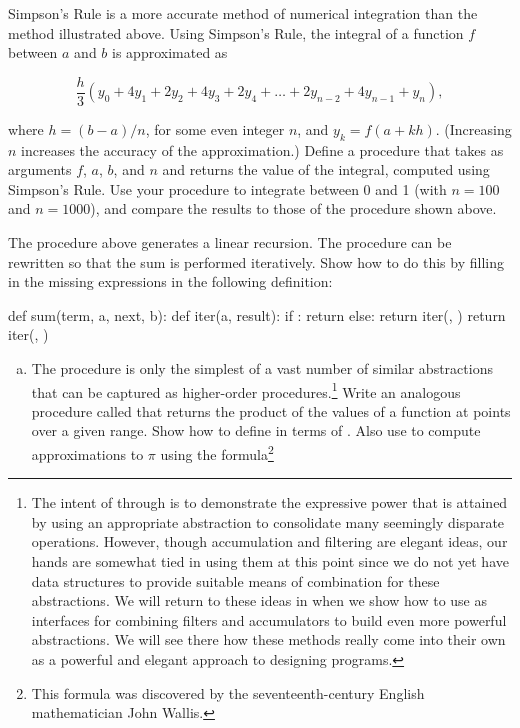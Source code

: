 \begin{exerciseGroup}
\label{Exercise 1.29}
 Simpson's Rule is a more accurate
method of numerical integration than the method illustrated above.  Using
Simpson's Rule, the integral of a function \( f \) between \( a \) and \( b \) is
approximated as

$$ \frac{h}{3}(y_0 + 4y_1 + 2y_2 + 4y_3 + 2y_4 + \dots + 2y_{n-2} + 4y_{n-1} + y_n), $$

\noindent
where \( h = (b - a) / n \), for some even integer \( n \), and
\( y_k = f(a + kh) \).  (Increasing \( n \) increases the
accuracy of the approximation.)  Define a procedure that takes as arguments
\( f \), \( a \), \( b \), and \( n \) and returns the value of the integral, computed
using Simpson's Rule.  Use your procedure to integrate  between 0
and 1 (with \( n = 100 \) and \( n = 1000 \)), and compare the results to those of
the  procedure shown above.

\label{Exercise 1.30}
 The  procedure above
generates a linear recursion.  The procedure can be rewritten so that the sum
is performed iteratively.  Show how to do this by filling in the missing
expressions in the following definition:

\begin{syntaxForm}
def sum(term, a, next, b):
    def iter(a, result):
        if :
            return 
        else:
            return iter(, )
    return iter(, )
\end{syntaxForm}

\label{Exercise 1.31}
 \begin{enumerate}[a.]
\item
The  procedure is only the simplest of a vast number of similar
abstractions that can be captured as higher-order procedures.\footnote{The
intent of  through  is to demonstrate the
expressive power that is attained by using an appropriate abstraction to
consolidate many seemingly disparate operations.  However, though accumulation
and filtering are elegant ideas, our hands are somewhat tied in using them at
this point since we do not yet have data structures to provide suitable means
of combination for these abstractions.  We will return to these ideas in
 when we show how to use  as interfaces
for combining filters and accumulators to build even more powerful
abstractions.  We will see there how these methods really come into their own
as a powerful and elegant approach to designing programs.}  Write an analogous
procedure called  that returns the product of the values of a
function at points over a given range.  Show how to define  in
terms of .  Also use  to compute approximations to
\( \pi \) using the formula\footnote{This formula was discovered by the
seventeenth-century English mathematician John Wallis.}


\end{enumerate}
\end{exerciseGroup}
